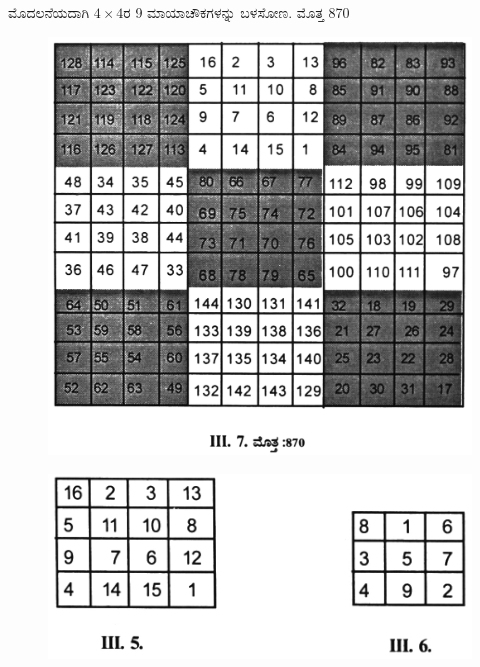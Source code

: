 ಮೊದಲನೆಯದಾಗಿ $4 \times 4$ರ 9 ಮಾಯಾಚೌಕಗಳನ್ನು ಬಳಸೋಣ. ಮೊತ್ತ 870
\begin{figure}[h]
\includegraphics{src/figures/chap3/fig3.33.jpg}
\end{figure}

\begin{figure}[h]
\includegraphics{src/figures/chap3/fig3.34.jpg}
\end{figure}

